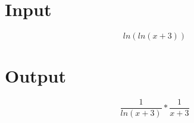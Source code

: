\documentclass[a4paper, 12pt]{article}
\begin{document}
\Large
\section{Input}

\[ln(ln(x + 3 ) ) \]
\section{Output}

\[\frac{1 }{ln(x + 3 ) }* \frac{1 }{x + 3 }\]
\end{document}
